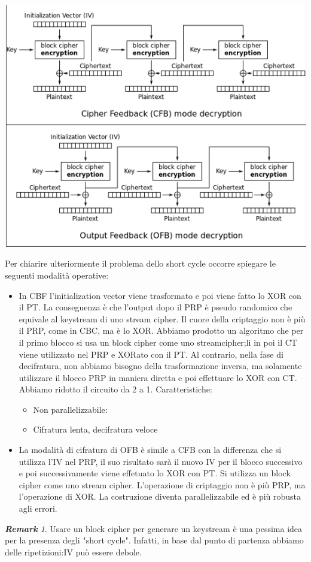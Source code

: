 \documentclass{book}
\theoremstyle{remark}
\newtheorem*{remark}{\textbf{Remark}}
\begin{document}
\begin{center}
	\includegraphics[scale=0.7]{CFBOFBDec.png}
\end{center}
Per chiarire ulteriormente il problema dello short cycle occorre spiegare le seguenti modalità operative:
\begin{itemize}
	\item In CBF l'initialization vector viene trasformato e poi viene fatto lo XOR con il PT\@. La conseguenza è che l'output dopo il PRP è pseudo randomico che equivale al keystream di uno stream cipher\@. Il cuore della criptaggio non è più il PRP, come in CBC, ma è lo XOR\@. Abbiamo prodotto un algoritmo che per il primo blocco si usa un block cipher come uno streamcipher;\@da li in poi il CT viene utilizzato nel PRP e XORato con il PT\@. Al contrario, nella fase di decifratura, non abbiamo bisogno della trasformazione inversa, ma solamente utilizzare il blocco PRP in maniera diretta e poi effettuare lo XOR con CT\@. Abbiamo ridotto il circuito da 2 a 1\@. Caratteristiche:\begin{itemize}
		      \item Non parallelizzabile:
		      \item Cifratura lenta, decifratura veloce
	      \end{itemize}
	\item La modalità di cifratura di OFB è simile a CFB con la differenza che si utilizza l'IV nel PRP, il suo risultato sarà il nuovo IV per il blocco successivo e poi successivamente viene effetuato lo XOR con PT\@. Si utilizza un block cipher come uno stream cipher\@. L'operazione di criptaggio non è più PRP, ma l'operazione di XOR\@. La costruzione diventa parallelizzabile ed è più robusta agli errori\@.
\end{itemize}
\begin{remark}
	Usare un block cipher per generare un keystream è una pessima idea per la presenza degli "short cycle"\@. Infatti, in base dal punto di partenza abbiamo delle ripetizioni:\@qualche IV può essere debole\@.
\end{remark}
\end{document}
